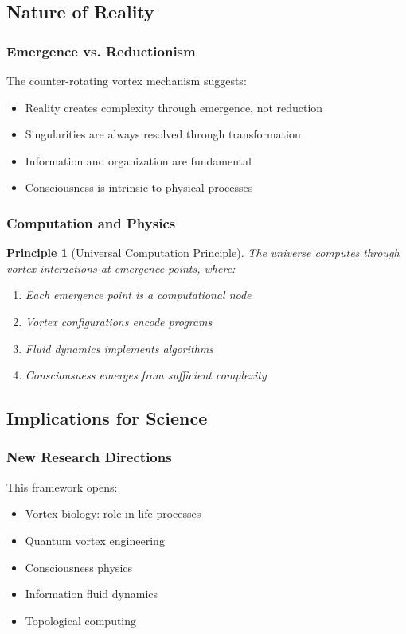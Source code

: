 \documentclass[12pt]{article}
\newtheorem{principle}[theorem]{Principle}
\begin{document}
\subsection{Nature of Reality}

\subsubsection{Emergence vs. Reductionism}

The counter-rotating vortex mechanism suggests:
\begin{itemize}
\item Reality creates complexity through emergence, not reduction
\item Singularities are always resolved through transformation
\item Information and organization are fundamental
\item Consciousness is intrinsic to physical processes
\end{itemize}

\subsubsection{Computation and Physics}

\begin{principle}[Universal Computation Principle]
The universe computes through vortex interactions at emergence points, where:
\begin{enumerate}
\item Each emergence point is a computational node
\item Vortex configurations encode programs
\item Fluid dynamics implements algorithms
\item Consciousness emerges from sufficient complexity
\end{enumerate}
\end{principle}

\subsection{Implications for Science}

\subsubsection{New Research Directions}

This framework opens:
\begin{itemize}
\item Vortex biology: role in life processes
\item Quantum vortex engineering
\item Consciousness physics
\item Information fluid dynamics
\item Topological computing
\end{itemize}
\end{document}
